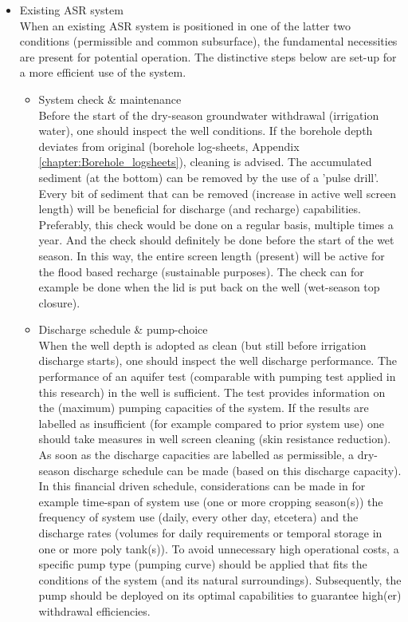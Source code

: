 \begin{itemize}
\item{Existing ASR system} \\
When an existing ASR system is positioned in one of the latter two conditions (permissible and common subsurface), the fundamental necessities are present for potential operation. The distinctive steps below are set-up for a more efficient use of the system.  
\begin{itemize}
\item{System check \& maintenance} \\
Before the start of the dry-season groundwater withdrawal (irrigation water), one should inspect the well conditions. If the borehole depth deviates from original (borehole log-sheets, Appendix \ref{chapter:Borehole_logsheets}), cleaning is advised. The accumulated sediment (at the bottom) can be removed by the use of a 'pulse drill'. Every bit of sediment that can be removed (increase in active well screen length) will be beneficial for discharge (and recharge) capabilities. Preferably, this check would be done on a regular basis, multiple times a year. And the check should definitely be done before the start of the wet season. In this way, the entire screen length (present) will be active for the flood based recharge (sustainable purposes). The check can for example be done when the lid is put back on the well (wet-season top closure). 
\item{Discharge schedule \& pump-choice} \\
When the well depth is adopted as clean (but still before irrigation discharge starts), one should inspect the well discharge performance. The performance of an aquifer test (comparable with pumping test applied in this research) in the well is sufficient. The test provides information on the (maximum) pumping capacities of the system. If the results are labelled as insufficient (for example compared to prior system use) one should take measures in well screen cleaning (skin resistance reduction). As soon as the discharge capacities are labelled as permissible, a dry-season discharge schedule can be made (based on this discharge capacity). In this financial driven schedule, considerations can be made in for example time-span of system use (one or more cropping season(s)) the frequency of system use (daily, every other day, etcetera) and the discharge rates (volumes for daily requirements or temporal storage in one or more poly tank(s)). To avoid unnecessary high operational costs, a specific pump type (pumping curve) should be applied that fits the conditions of the system (and its natural surroundings). Subsequently, the pump should be deployed on its optimal capabilities to guarantee high(er) withdrawal efficiencies. 

\end{itemize}
\end{itemize}
